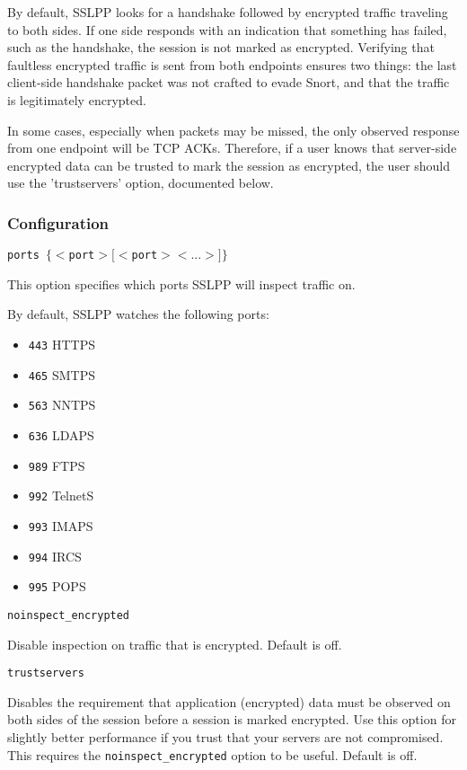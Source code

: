 \documentclass[english]{report}
\newcounter{slistnum}
\newenvironment{slist}
{ \begin{list}{ {\bf \arabic{slistnum}.} }{\usecounter{slistnum} } }
{ \end{list} }
\begin{document}
By default, SSLPP looks for a handshake followed by encrypted traffic
traveling to both sides.  If one side responds with an indication that
something has failed, such as the handshake, the session is not marked as
encrypted.  Verifying that faultless encrypted traffic is sent from both
endpoints ensures two things: the last client-side handshake packet was not
crafted to evade Snort, and that the traffic is legitimately encrypted.

In some cases, especially when packets may be missed, the only observed
response from one endpoint will be TCP ACKs.  Therefore, if a user knows that
server-side encrypted data can be trusted to mark the session as encrypted, the
user should use the 'trustservers' option, documented below.

\subsubsection{Configuration}

\begin{slist}

\item \texttt{ports $\{ <$port$> [<$port$> <...>] \}$}

This option specifies which ports SSLPP will inspect traffic on.

By default, SSLPP watches the following ports:
    
\begin{itemize}
    \item \texttt{443}     HTTPS   
    \item \texttt{465}     SMTPS   
    \item \texttt{563}     NNTPS                                                                
    \item \texttt{636}     LDAPS
    \item \texttt{989}     FTPS
    \item \texttt{992}     TelnetS  
    \item \texttt{993}     IMAPS                 
    \item \texttt{994}     IRCS
    \item \texttt{995}     POPS
\end{itemize}

\item \texttt{noinspect\_encrypted}

Disable inspection on traffic that is encrypted.  Default is off.

\item \texttt{trustservers}

Disables the requirement that application (encrypted) data must be observed on
both sides of the session before a session is marked encrypted.  Use this
option for slightly better performance if you trust that your servers are not
compromised.  This requires the \texttt{noinspect\_encrypted} option to be
useful.  Default is off.  
\end{slist}
\end{document}
